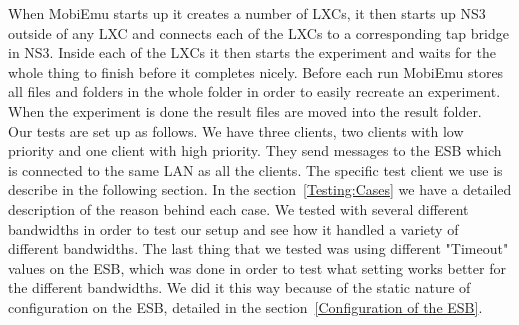     When MobiEmu starts up it creates a number of LXCs, it then starts up NS3 outside of any LXC and connects each of the LXCs to a corresponding tap bridge in NS3. Inside each of the LXCs it then starts the experiment and waits for the whole thing to finish before it completes nicely. Before each run MobiEmu stores all files and folders in the whole folder in order to easily recreate an experiment. When the experiment is done the result files are moved into the result folder. \\
    
    Our tests are set up as follows. We have three clients, two clients with low priority and one client with high priority. They send messages to the ESB which is connected to the same LAN as all the clients. The specific test client we use is describe in the following section. In the section~\ref{Testing:Cases} we have a detailed description of the reason behind each case. We tested with several different bandwidths in order to test our setup and see how it handled a variety of different bandwidths. The last thing that we tested was using different "Timeout" values on the ESB, which was done in order to test what setting works better for the different bandwidths. We did it this way because of the static nature of configuration on the ESB, detailed in the section~\ref{Configuration of the ESB}.
